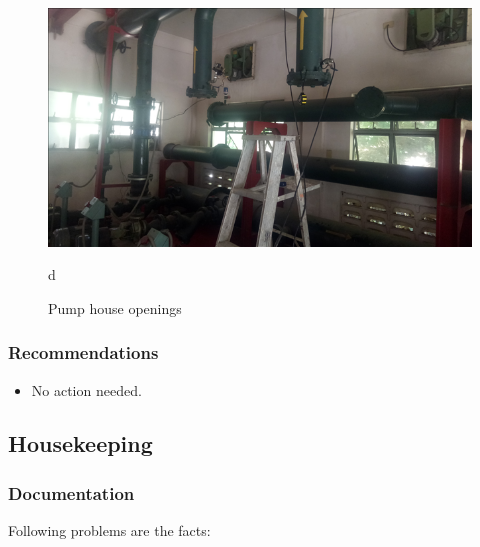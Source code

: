 \begin{figure}[!htb]
\begin{minipage}[b]{0.225\linewidth}
		\centering
		\includegraphics[width=\textwidth]{figures/fig_ch043_illus}
		\caption*{d}
	\end{minipage}
	\caption{Pump house openings}
	\label{fig_ch047_wem_window}
\end{figure}



\subsubsection{Recommendations}

\begin{itemize}
	\item No action needed.
\end{itemize}

\subsection{Housekeeping}\label{aq05}
\subsubsection{Documentation}
Following problems are the facts:

